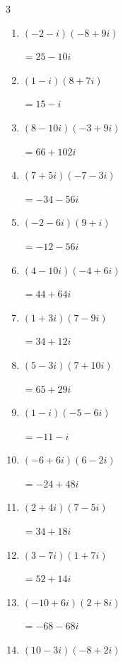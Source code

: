 \begin{multicols}{3}
\begin{enumerate}
  \item $\displaystyle (-2-i)(-8+9i)$

        $\displaystyle =25-10i$

  \item $\displaystyle (1-i)(8+7i)$

        $\displaystyle =15-i$

  \item $\displaystyle (8-10i)(-3+9i)$

        $\displaystyle =66+102i$

  \item $\displaystyle (7+5i)(-7-3i)$

        $\displaystyle =-34-56i$

  \item $\displaystyle (-2-6i)(9+i)$

        $\displaystyle =-12-56i$

\columnbreak %

  \item $\displaystyle (4-10i)(-4+6i)$

        $\displaystyle =44+64i$

  \item $\displaystyle (1+3i)(7-9i)$

        $\displaystyle =34+12i$

  \item $\displaystyle (5-3i)(7+10i)$

        $\displaystyle =65+29i$

  \item $\displaystyle (1-i)(-5-6i)$

        $\displaystyle =-11-i$

  \item $\displaystyle (-6+6i)(6-2i)$

        $\displaystyle =-24+48i$

  \item $\displaystyle (2+4i)(7-5i)$

        $\displaystyle =34+18i$

  \item $\displaystyle (3-7i)(1+7i)$

        $\displaystyle =52+14i$

  \item $\displaystyle (-10+6i)(2+8i)$

        $\displaystyle =-68-68i$

  \item $\displaystyle (10-3i)(-8+2i)$


\end{enumerate}
\end{multicols}
